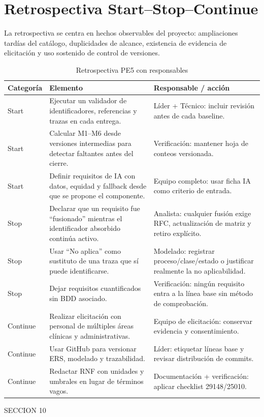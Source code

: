 \documentclass[11pt,a4paper]{article}
\begin{document}
\section{Retrospectiva Start--Stop--Continue}
La retrospectiva se centra en hechos observables del proyecto: ampliaciones tardías del catálogo, duplicidades de alcance, existencia de evidencia de elicitación y uso sostenido de control de versiones.
\begin{longtable}{p{2.2cm}p{8cm}p{5.5cm}}
	\caption{Retrospectiva PE5 con responsables}\label{tab:retro}\\\toprule\textbf{Categoría}&\textbf{Elemento}&\textbf{Responsable / acción}\\\midrule\endhead
	Start&Ejecutar un validador de identificadores, referencias y trazas en cada entrega.&Líder + Técnico: incluir revisión antes de cada baseline.\\
	Start&Calcular M1--M6 desde versiones intermedias para detectar faltantes antes del cierre.&Verificación: mantener hoja de conteos versionada.\\
	Start&Definir requisitos de IA con datos, equidad y fallback desde que se propone el componente.&Equipo completo: usar ficha IA como criterio de entrada.\\
	Stop&Declarar que un requisito fue ``fusionado'' mientras el identificador absorbido continúa activo.&Analista: cualquier fusión exige RFC, actualización de matriz y retiro explícito.\\
	Stop&Usar ``No aplica'' como sustituto de una traza que sí puede identificarse.&Modelado: registrar proceso/clase/estado o justificar realmente la no aplicabilidad.\\
	Stop&Dejar requisitos cuantificados sin BDD asociado.&Verificación: ningún requisito entra a la línea base sin método de comprobación.\\
	Continue&Realizar elicitación con personal de múltiples áreas clínicas y administrativas.&Equipo de elicitación: conservar evidencia y consentimiento.\\
	Continue&Usar GitHub para versionar ERS, modelado y trazabilidad.&Líder: etiquetar líneas base y revisar distribución de commits.\\
	Continue&Redactar RNF con unidades y umbrales en lugar de términos vagos.&Documentación + verificación: aplicar checklist 29148/25010.\\\bottomrule\end{longtable}
\clearpage

  SECCION 10
\end{document}
